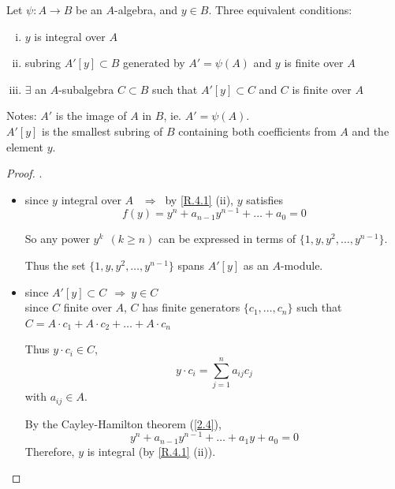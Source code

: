 \documentclass{article}
\theoremstyle{definition}
\newenvironment{prop}[1]
{\renewcommand\theinnerprop{#1}\innerprop}
{\endinnerprop}
\begin{document}
\begin{prop}{R.4.2}\label{R.4.2}
  Let $\psi: A \longrightarrow B$ be an $A$-algebra, and $y \in B$. Three equivalent conditions:

  \begin{enumerate}[i.]
    \item $y$ is integral over $A$
    \item subring $A'[y] \subset B$ generated by $A' = \psi(A)$ and $y$ is finite over $A$
    \item $\exists$ an $A$-subalgebra $C \subset B$ such that $A'[y] \subset C$ and $C$ is finite over $A$
  \end{enumerate}

  Notes: $A'$ is the image of $A$ in $B$, ie. $A' = \psi(A)$.\\
  $A'[y]$ is the smallest subring of $B$ containing both coefficients from $A$ and the element $y$.
\end{prop}
\begin{proof} .\\
  \begin{itemize}
    \item[(i to ii):]
  since $y$ integral over $A$ $~~\Longrightarrow~$ by \ref{R.4.1} (ii), $y$ satisfies
  $$f(y) = y^n + a_{n-1} y^{n-1} + \ldots + a_0 = 0$$

  So any power $y^k~~ (k\geq n)$ can be expressed in terms of $\{1, y, y^2, \ldots, y^{n-1} \}$.

  Thus the set $\{1, y, y^2, \ldots, y^{n-1} \}$ spans $A'[y]$ as an $A$-module.

    \item[(iii to i):]
      since $A'[y] \subset C ~~\Longrightarrow~ y \in C$\\
      since $C$ finite over $A$, $C$ has finite generators $\{ c_1, \ldots, c_n \}$ such that $C = A \cdot c_1 + A \cdot c_2 + \ldots + A \cdot c_n$

      Thus $y \cdot c_i \in C$,
      $$y \cdot c_i = \sum_{j=1}^n a_{ij} c_j$$
      with $a_{ij} \in A$.

      By the Cayley-Hamilton theorem (\ref{2.4}),
      $$y^n + a_{n-1} y^{n-1} + \ldots + a_1 y + a_0 = 0$$
      Therefore, $y$ is integral (by \ref{R.4.1} (ii)).
  \end{itemize}
\end{proof}
\end{document}
